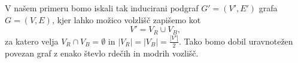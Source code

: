 \documentclass[a4paper, 11pt]{article}
\theoremstyle{definition}
\begin{document}
    V našem primeru bomo iskali tak inducirani podgraf $G' = (V', E')$ grafa $G = (V, E)$, kjer lahko možico volzlišč
    zapišemo kot 
        $$ V' = V_{R} \cup V_{B},$$
    za katero velja $ V_{R} \cap  V_{B} = \emptyset $ in $|V_{R}| = |V_{B}| = \frac{|V'|}{2}$. Tako bomo dobil
    uravnotežen povezan graf z enako števlo rdečih in modrih vozlišč.
\end{document}
